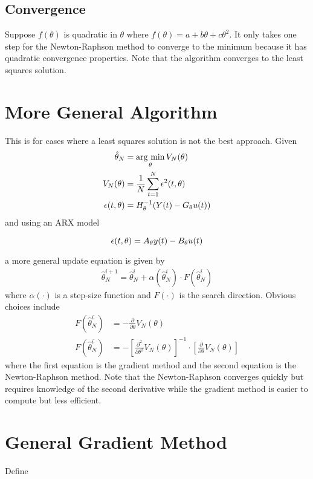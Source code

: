 \subsection{Convergence}
Suppose $f(\theta)$ is quadratic in $\theta$ where $f(\theta)=a+b\theta+c\theta^2$.
It only takes one step for the Newton-Raphson method to converge to the minimum because it has quadratic convergence properties.
Note that the algorithm converges to the least squares solution.

\section{More General Algorithm}
This is for cases where a least squares solution is not the best approach.
Given
\begin{align*}
\hat{\theta}_N &= \mathop{\arg\,\min}\limits_\theta V_N(\theta) \\
V_N(\theta) &= \frac{1}{N}\sum_{t=1}^N\epsilon^2(t,\theta) \\
\epsilon(t,\theta) &= H_\theta^{-1}(Y(t)-G_\theta u(t))
\end{align*}
and using an ARX model

\begin{equation*}
\epsilon(t,\theta) = A_\theta y(t)-B_\theta u(t)
\end{equation*}

a more general update equation is given by
\begin{align*}
\boxed{\hat{\theta}_N^{i+1} = \hat{\theta}_N^i + \alpha(\hat{\theta}_N^i)\cdot F(\hat{\theta}_N^i)}
\end{align*}
where $\alpha(\cdot)$ is a step-size function and $F(\cdot)$ is the search direction.
Obvious choices include
\begin{align*}
F(\hat{\theta}_N^i) &= -\frac{\partial}{\partial\theta}V_N(\theta) \\
F(\hat{\theta}_N^i) &= -{\left[\frac{\partial^2}{\partial\theta^2}V_N(\theta)\right]}^{-1}\cdot\left[\frac{\partial}{\partial\theta}V_N(\theta)\right]
\end{align*}
where the first equation is the gradient method and the second equation is the Newton-Raphson method.
Note that the Newton-Raphson converges quickly but requires knowledge of the second derivative while the gradient method is easier to compute but less efficient.

\section{General Gradient Method}
Define

